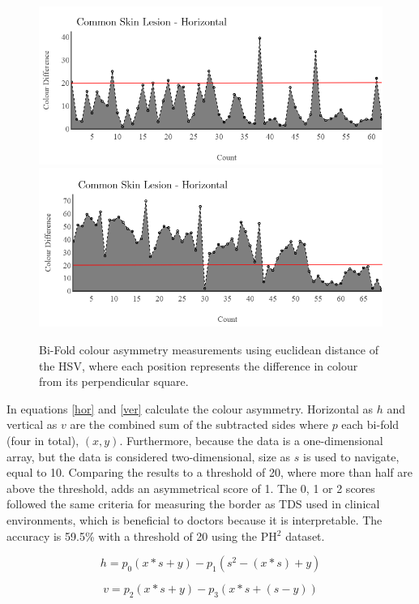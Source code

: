 \documentclass[10.5pt]{report}
\begin{document}
\begin{figure} 
\includegraphics[scale=0.7]{common-h.png}
\includegraphics[scale=0.7]{common-v.png}
\caption{Bi-Fold colour asymmetry measurements using euclidean distance of the HSV, where each position represents the difference in colour from its perpendicular square.}\label{asy-graph2}
\end{figure} 

In equations \ref{hor} and \ref{ver} calculate the colour asymmetry. Horizontal as $h$ and vertical as $v$ are the combined sum of the subtracted sides where $p$ each bi-fold (four in total), $(x,y)$. Furthermore, because the data is a one-dimensional array, but the data is considered two-dimensional, size as $s$ is used to navigate, equal to 10. Comparing the results to a threshold of 20, where more than half are above the threshold, adds an asymmetrical score of 1. The 0, 1 or 2 scores followed the same criteria for measuring the border as TDS used in clinical environments, which is beneficial to doctors because it is interpretable. The accuracy is 59.5\% with a threshold of 20 using the PH$^2$ dataset.

\begin{equation} \label{hor}
h = p_0(x*s+y) - p_1(s^2-(x*s)+y)
\end{equation}

\begin{equation} \label{ver}
v = p_2(x*s+y) - p_3(x*s+(s-y))
\end{equation}
\end{document}
